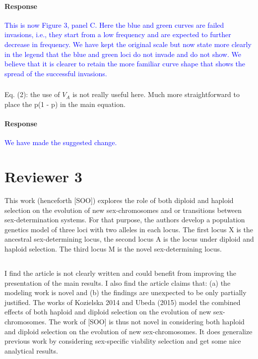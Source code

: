 \documentclass[10pt,letterpaper]{article}
\begin{document}
\noindent\paragraph{Response}
\textcolor{blue}{This is now Figure 3, panel C. Here the blue and green curves are failed invasions, i.e., they start from a low frequency and are expected to further decrease in frequency. We have kept the original scale but now state more clearly in the legend that the blue and green loci do not invade and do not show. We believe that it is clearer to retain the more familiar curve shape that shows the spread of the successful invasions. }

\noindent\subsubsection{}
Eq. (2): the use of $V_A$ is not really useful here. Much more straightforward to place the p(1 - p) in the main equation.

\noindent\paragraph{Response}
\textcolor{blue}{We have made the suggested change.}

\section{Reviewer 3}

This work (henceforth [SOO]) explores the role of both diploid and haploid selection on the evolution of new sex-chromosomes and or transitions between sex-determination systems. For that purpose, the authors develop a population genetics model of three loci with two alleles in each locus. The first locus X is the ancestral sex-determining locus, the second locus A is the locus under diploid and haploid selection. The third locus M is the novel sex-determining locus.

\noindent\subsection{}
I find the article is not clearly written and could benefit from improving the presentation of the main results. 
I also find the article claims that: (a) the modeling work is novel and (b) the findings are unexpected to be only partially justified.
The works of Kozielska 2014 and Ubeda (2015) model the combined effects of both haploid and diploid selection on the evolution of new sex-chromosomes. The work of [SOO] is thus not novel in considering both haploid and diploid selection on the evolution of new sex-chromosomes. It does generalize previous work by considering sex-specific viability selection and get some nice analytical results.
\end{document}
